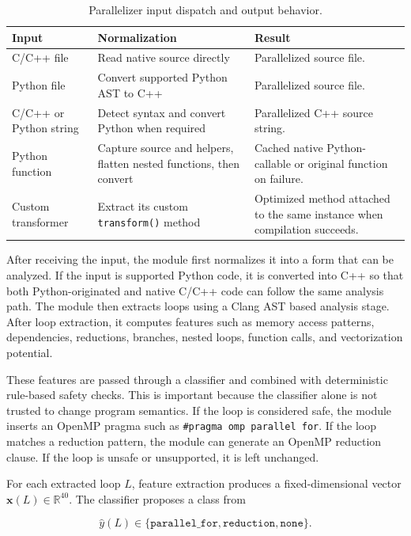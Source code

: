 \documentclass[12pt,a4paper]{report}
\newcommand{\acceleraTableStyle}{%
\small
\renewcommand{\arraystretch}{1.15}
\setlength{\tabcolsep}{4pt}%
}
\begin{document}
\begin{table}[!htbp]
\centering
\acceleraTableStyle
\caption{Parallelizer input dispatch and output behavior.}
\label{tab:parallelizer-input-dispatch}
\begin{tabularx}{\textwidth}{p{}p{}X}
\toprule
\textbf{Input} & \textbf{Normalization} & \textbf{Result} \\
\midrule
C/C++ file & Read native source directly & Parallelized source file. \\
Python file & Convert supported Python AST to C++ & Parallelized source file. \\
C/C++ or Python string & Detect syntax and convert Python when required &
Parallelized C++ source string. \\
Python function & Capture source and helpers, flatten nested functions, then
convert & Cached native Python-callable or original function on failure. \\
Custom transformer & Extract its custom \texttt{transform()} method & Optimized
method attached to the same instance when compilation succeeds. \\
\bottomrule
\end{tabularx}
\end{table}

After receiving the input, the module first normalizes it into a form that can
be analyzed. If the input is supported Python code, it is converted into C++ so
that both Python-originated and native C/C++ code can follow the same analysis
path. The module then extracts loops using a Clang AST based analysis stage.
After loop extraction, it computes features such as memory access patterns,
dependencies, reductions, branches, nested loops, function calls, and
vectorization potential.

These features are passed through a classifier and combined with deterministic
rule-based safety checks. This is important because the classifier alone is not
trusted to change program semantics. If the loop is considered safe, the module
inserts an OpenMP pragma such as \texttt{\#pragma omp parallel for}. If the loop
matches a reduction pattern, the module can generate an OpenMP reduction clause.
If the loop is unsafe or unsupported, it is left unchanged.

For each extracted loop $L$, feature extraction produces a fixed-dimensional
vector $\mathbf{x}(L)\in\mathbb{R}^{40}$. The classifier proposes a class from

\begin{equation}
\hat{y}(L)\in
\{\texttt{parallel\_for},\texttt{reduction},\texttt{none}\}.
\end{equation}
\end{document}
